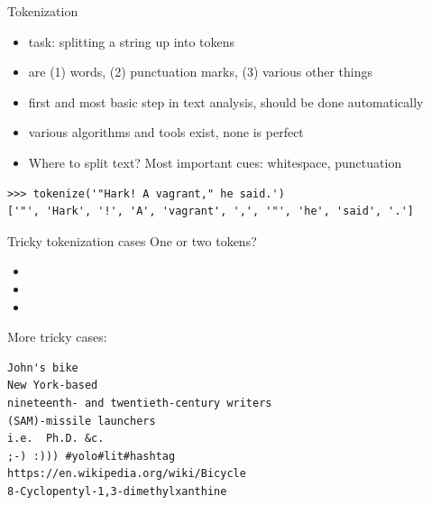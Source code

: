 \documentclass[aspectratio=169,usenames,dvipsnames]{beamer}
\begin{document}
\begin{frame}[fragile]{Tokenization}
 \begin{itemize}
  \item task: splitting a string up into tokens
  \item {} are (1) words, (2) punctuation marks, (3) various other things
  \item first and most basic step in text analysis,
        should be done automatically
  \item various algorithms and tools exist, none is perfect
  \item Where to split text? Most important cues: whitespace, punctuation
 \end{itemize}
 \begin{lstlisting}
>>> tokenize('"Hark! A vagrant," he said.')
['"', 'Hark', '!', 'A', 'vagrant', ',', '"', 'he', 'said', '.']
 \end{lstlisting}
\end{frame}

\begin{frame}[fragile]{Tricky tokenization cases}
One or two tokens?
 \begin{itemize}
  \item {}
  \item {}
  \item {}
 \end{itemize}

\pause
\vspace{1em}
More tricky cases:
\begin{verbatim}
John's bike
New York-based
nineteenth- and twentieth-century writers
(SAM)-missile launchers
i.e.  Ph.D. &c.
;-) :))) #yolo#lit#hashtag
https://en.wikipedia.org/wiki/Bicycle
8-Cyclopentyl-1,3-dimethylxanthine
\end{verbatim}
\end{frame}
\end{document}
